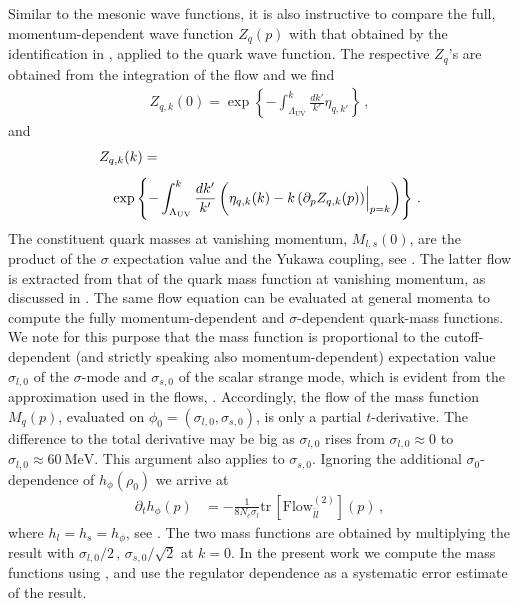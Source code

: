 \documentclass[aps,twocolumn,prd,superscriptaddress]{revtex4-2}
\begin{document}
Similar to the mesonic wave functions, it is also instructive to compare the full, momentum-dependent wave function $Z_q(p)$ with that obtained by the identification in , applied to the quark wave function. 
The respective $Z_q$'s are obtained from the integration of the flow and we find 
%
\begin{align}\label{eq:Zqp0}
	Z_{q,k}(0) = \exp\left\{- \int_{\Lambda_{\textrm{UV}}}^k \frac{d k'}{k'} \eta_{q,k'}\right\}\,, 
\end{align}
%
and 
%
\begin{align}\label{eq:Zqpk}
	&Z_{q,k}(k)= \notag \\[1ex]
	&\hspace{3mm}\exp\left\{-\int_{\Lambda_\textrm{UV}}^k \frac{d k'}{k'} \left( \eta_{q,k}(k) - k \,(\partial_p Z_{q,k}(p))\Big\vert_{p=k}\right)\right\}\,.
\end{align}
%
The constituent quark masses at vanishing momentum, $M_{l,s}(0)$, are the product of the $\sigma$ expectation value and the Yukawa coupling, see . 
The latter flow is extracted from that of the quark mass function at vanishing momentum, as discussed in . 
The same flow equation can be evaluated at general momenta to compute the fully momentum-dependent and $\sigma$-dependent quark-mass functions. We note for this purpose that the mass function is proportional to the cutoff-dependent (and strictly speaking also momentum-dependent) expectation value $\sigma_{l,0}$ of the $\sigma$-mode and $\sigma_{s,0}$ of the scalar strange mode, which is evident from the approximation used in the flows, . Accordingly, the flow of the mass function $M_q(p)$, evaluated on $\phi_0=(\sigma_{l,0},\sigma_{s,0})$, is only a partial $t$-derivative. The difference to the total derivative may be big as $\sigma_{l,0}$ rises from $\sigma_{l,0}\approx 0$ to $\sigma_{l,0} \approx \qty{60}{\MeV}$. This argument also applies to $\sigma_{s,0}$. Ignoring the additional $\sigma_0$-dependence of $h_\phi(\rho_0)$ we arrive at 
%
\begin{align}
	\partial_t h_\phi(p) & = - \frac{1}{8 N_c \sigma_l} \mathrm{tr}\,\left[\textrm{Flow}_{\bar ll}^{(2)}\right](p)\,,
	\label{eq:Flowhphip}
\end{align}
%
where $h_l=h_s=h_\phi$, see . The two mass functions are obtained by multiplying the result with $\sigma_{l,0}/2 \,, \,\sigma_{s,0}/\sqrt{2}$ at $k=0$. In the present work we compute the mass functions using , and use the regulator dependence as a systematic error estimate of the result.  
\end{document}
